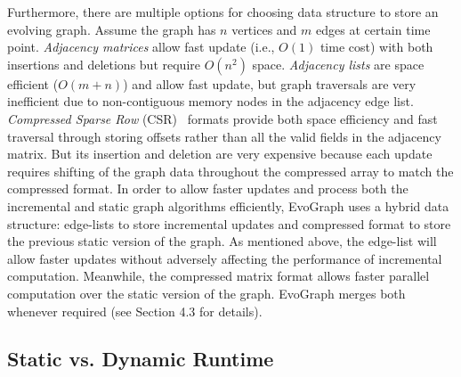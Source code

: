 Furthermore, there are multiple options for choosing data structure to store an evolving graph. Assume the graph has $n$ vertices and $m$ edges at certain time point. \textit{Adjacency matrices} allow fast update (i.e., $O(1)$ time cost) with both insertions and deletions but require $O(n^2)$ space. \textit{Adjacency lists} are space efficient ($O(m+n)$) and allow fast update, but graph traversals are very inefficient due to non-contiguous memory nodes in the adjacency edge list. \textit{Compressed Sparse Row} (CSR)~\cite{csr} formats provide both space efficiency and fast traversal through storing offsets rather than all the valid fields in the adjacency matrix. But its insertion and deletion are very expensive because each update requires shifting of the graph data throughout the compressed array to match the compressed format. In order to allow faster updates and process both the incremental and static graph algorithms efficiently, EvoGraph uses a hybrid data structure: edge-lists to store incremental updates and compressed format to store the previous static version of the graph. As mentioned above, the edge-list will allow faster updates without adversely affecting the performance of incremental computation. Meanwhile, the compressed matrix format allows faster parallel computation over the static version of the graph. EvoGraph merges both whenever required (see Section 4.3 for details).


\subsection{Static vs. Dynamic Runtime}


